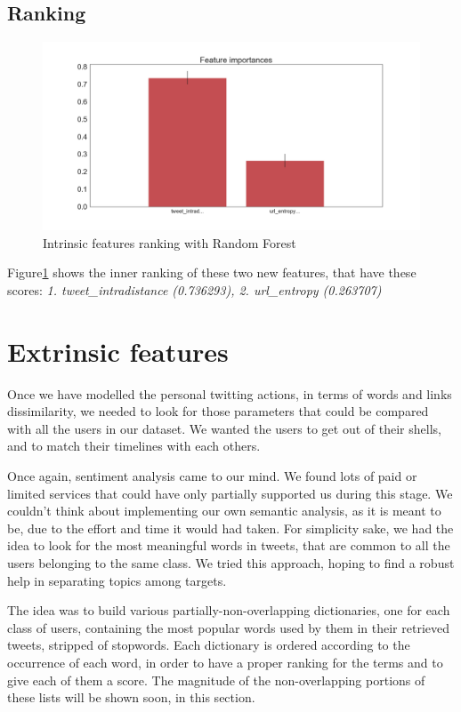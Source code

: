 \subsection{Ranking}
\begin{figure}[htp!]
	\centering
	\includegraphics[width=\columnwidth]{chapter4/figure/intrinsic_features_importances.png}
	\caption{Intrinsic features ranking with Random Forest}
	\label{fig:intr_rank}
\end{figure}
Figure\ref{fig:intr_rank} shows the inner ranking of these two new features, that have these scores:
\textit{1. tweet\_intradistance (0.736293), 2. url\_entropy (0.263707)}
\section{Extrinsic features}
Once we have modelled the personal twitting actions, in terms of words and links dissimilarity, we needed to look for those parameters that could be compared with all the users in our dataset.
We wanted the users to get out of their shells, and to match their timelines with each others.

Once again, sentiment analysis came to our mind. We found lots of paid or limited services that could have only partially supported us during this stage.
We couldn't think about implementing our own semantic analysis, as it is meant to be, due to the effort and time it would had taken.
For simplicity sake, we had the idea to look for the most meaningful words in tweets, that are common to all the users belonging to the same class.
We tried this approach, hoping to find a robust help in separating topics among targets.

The idea was to build various partially-non-overlapping dictionaries, one for each class of users, containing the most popular words used by them in their retrieved tweets, stripped of stopwords. Each dictionary is ordered according to the occurrence of each word, in order to have a proper ranking for the terms and to give each of them a score.
The magnitude of the non-overlapping portions of these lists will be shown soon, in this section.


